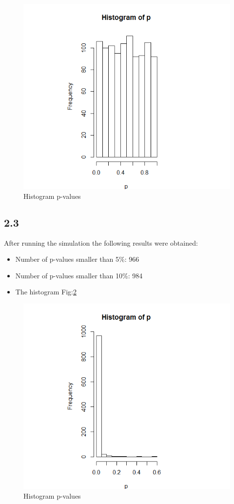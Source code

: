 \documentclass{article}
\begin{document}
      \begin{figure}
        \centering
        \includegraphics[width=.8\linewidth]{results/2_2}
        \caption{Histogram p-values}
        \label{fig:2_2}
      \end{figure}


    \subsection{2.3}
      After running the simulation the following results were obtained:
      \begin{itemize}
        \item Number of p-values smaller than 5\%: 966
        \item Number of p-values smaller than 10\%: 984
        \item The histogram Fig:\ref{fig:2_3}
      \end{itemize}
      
      \begin{figure}
        \centering
        \includegraphics[width=.8\linewidth]{results/2_3}
        \caption{Histogram p-values}
        \label{fig:2_3}
      \end{figure}
      
\end{document}
